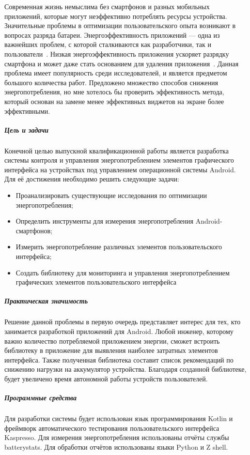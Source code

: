 

Современная жизнь немыслима без смартфонов и разных мобильных приложений, которые могут неэффективно потреблять ресурсы устройства. Значительные проблемы в оптимизации пользовательского опыта возникают в вопросах разряда батареи. Энергоэффективность приложений --- одна из важнейших проблем, с которой сталкиваются как разработчики, так и пользователи~\parencite{man2016experience, wasserman2010software}. Низкая энергоэффективность приложения ускоряет разрядку смартфона и может даже стать основанием для удаления приложения~\parencite{ickin2017users}. Данная проблема имеет популярность среди исследователей, и является предметом большого количества работ. Предложено множество способов снижения энергопотребления, но мне хотелось бы проверить эффективность метода, который основан на замене менее эффективных виджетов на экране более эффективными.

\subparagraph{Цель и задачи}
Конечной целью выпускной квалификационной работы является разработка системы контроля и управления энергопотреблением элементов графического интерфейса на устройствах под управлением операционной системы Android. Для её достижения необходимо решить следующие задачи:
\begin{itemize}
	\item Проанализировать существующие исследования по оптимизации энергопотребления;
	\item Определить инструменты для измерения энергопотребления Android-смартфонов;
	\item Измерить энергопотребление различных элементов пользовательского интерфейса;
	\item Создать библиотеку для мониторинга и управления энергопотреблением графических элементов пользовательского интерфейса
\end{itemize}

\subparagraph{Практическая значимость}
Решение данной проблемы в первую очередь представляет интерес для тех, кто занимается разработкой приложений для Android. Любой инженер, которому важно количество потребляемой приложением энергии, сможет встроить библиотеку в приложение для выявления наиболее затратных элементов интерфейса. Также полученная библиотека составит список рекомендаций по снижению нагрузки на аккумулятор устройства. Благодаря созданной библиотеке, будет увеличено время автономной работы устройств пользователей.

\subparagraph{Программные средства}
Для разработки системы будет использован язык программирования Kotlin и фреймворк автоматического тестирования пользовательского интерфейса Kaspresso. Для измерения энергопотребления использованы отчёты службы batterystats. Для обработки отчётов использованы языки Python и Z shell.